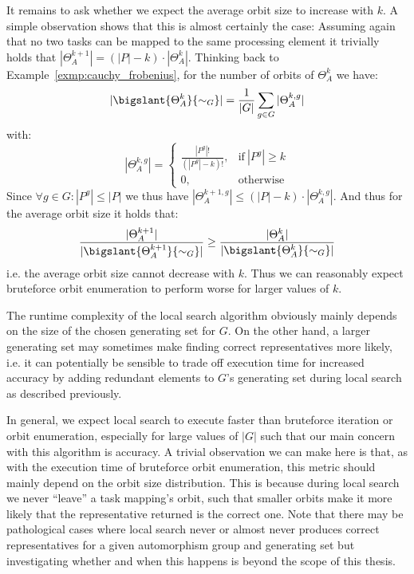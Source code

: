 It remains to ask whether we expect the average orbit size to increase with
$k$. A simple observation shows that this is almost certainly the case:
Assuming again that no two tasks can be mapped to the same processing element
it trivially holds that $|\Theta_A^{k+1}| = (|P| - k) \cdot |\Theta_A^k|$.
Thinking back to Example~\ref{exmp:cauchy_frobenius}, for the number of orbits
of $\Theta_A^k$ we have:
%
\begin{equation*}
 |\bigslant{\Theta_A^k}{\sim_G}| =
 \frac{1}{|G|} \sum_{g \in G} |\Theta_A^{k,g}|
\end{equation*}
%
with:
%
\begin{equation*}
 |\Theta_A^{k,g}| =
 \begin{cases}
   \frac{|P^g|!}{(|P^g| - k)!}, &\text{if}\ |P^g| \geq k\\
   0,                           &\text{otherwise}
 \end{cases}
\end{equation*}
%
Since $\forall g \in G: |P^g| \leq |P|$ we thus have
$|\Theta_A^{k+1,g}| \leq (|P| - k) \cdot |\Theta_{A}^{k,g}|$. And thus
for the average orbit size it holds that:
%
\begin{equation*}
  \frac{|\Theta_A^{k+1}|}{|\bigslant{\Theta_A^{k+1}}{\sim_G}|}
    \geq
  \frac{|\Theta_A^k|}{|\bigslant{\Theta_A^k}{\sim_G}|}
\end{equation*}
%
i.e. the average orbit size cannot decrease with $k$. Thus we can reasonably
expect bruteforce orbit enumeration to perform worse for larger
values of $k$.

The runtime complexity of the local search algorithm obviously mainly depends
on the size of the chosen generating set for $G$. On the other hand, a larger
generating set may sometimes make finding correct representatives more likely,
i.e. it can potentially be sensible to trade off execution time for increased
accuracy by adding redundant elements to $G$'s generating set during local
search as described previously.

In general, we expect local search to execute faster than bruteforce iteration
or orbit enumeration, especially for large values of $|G|$ such that our main
concern with this algorithm is accuracy. A trivial observation we can make here
is that, as with the execution time of bruteforce orbit enumeration, this
metric should mainly depend on the orbit size distribution. This is because
during local search we never ``leave'' a task mapping's orbit, such that smaller
orbits make it more likely that the representative returned is the correct one.
Note that there may be pathological cases where local search never or almost
never produces correct representatives for a given automorphism group and
generating set but investigating whether and when this happens is beyond the
scope of this thesis.

